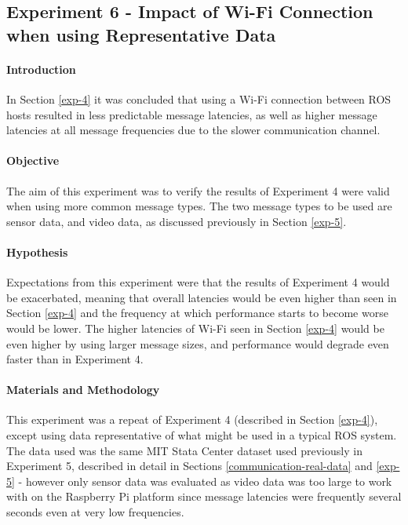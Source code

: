 \documentclass[../dissertation.tex]{subfiles}
\begin{document}
\subsection{Experiment 6 - Impact of Wi-Fi Connection when using Representative Data}
\label{experiment-6}

\paragraph{Introduction} In Section \ref{exp-4} it was concluded that using a Wi-Fi connection between ROS hosts resulted in less predictable message latencies, as well as higher message latencies at all message frequencies due to the slower communication channel.

\paragraph{Objective} The aim of this experiment was to verify the results of Experiment 4 were valid when using more common message types. The two message types to be used are sensor data, and video data, as discussed previously in Section \ref{exp-5}.

\paragraph{Hypothesis} Expectations from this experiment were that the results of Experiment 4 would be exacerbated, meaning that overall latencies would be even higher than seen in Section \ref{exp-4} and the frequency at which performance starts to become worse would be lower. The higher latencies of Wi-Fi seen in Section \ref{exp-4} would be even higher by using larger message sizes, and performance would degrade even faster than in Experiment 4.

\paragraph{Materials and Methodology} This experiment was a repeat of Experiment 4 (described in Section \ref{exp-4}), except using data representative of what might be used in a typical ROS system. The data used was the same MIT Stata Center dataset used previously in Experiment 5, described in detail in Sections \ref{communication-real-data} and \ref{exp-5} - however only sensor data was evaluated as video data was too large to work with on the Raspberry Pi platform since message latencies were frequently several seconds even at very low frequencies.
\end{document}
